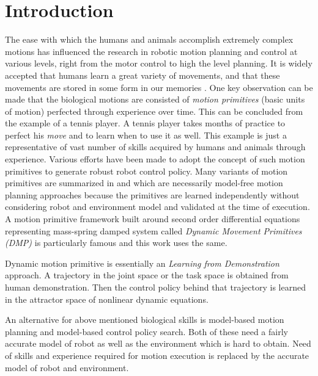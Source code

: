 
\chapter{Introduction}

The ease with which the humans and animals accomplish extremely complex motions has influenced the research in robotic motion planning and control at various levels, right from the motor control to high the level planning. It is widely accepted that humans learn a great variety of movements, and that these movements are stored in some form in our memories \cite{lim2005movement}. One key observation can be made that the biological motions are consisted of \textit{motion primitives} (basic units of motion) perfected through experience over time\cite{schaal2006dynamic}. This can be concluded from the example of a tennis player. A tennis player takes months of practice to perfect his \textit{move} and to learn when to use it as well. This example is just a representative of vast number of skills acquired by humans and animals through experience. Various efforts have been made to adopt the concept of such motion primitives to generate robust robot control policy. Many variants of motion primitives are summarized in \cite{kober2013reinforcement} and \cite{deisenroth2013survey} which are necessarily model-free motion planning approaches because the primitives are learned independently without considering robot and environment model and validated at the time of execution. A motion primitive framework built around second order differential equations representing mass-spring damped system called \textit{Dynamic Movement Primitives (DMP)} is particularly famous and this work uses the same.  

\par Dynamic motion primitive is essentially an \textit{Learning from Demonstration} approach. A trajectory in the joint space or the task space is obtained from human demonstration. Then the control policy behind that trajectory is learned in the attractor space of nonlinear dynamic equations.

\par An alternative for above mentioned biological skills is model-based motion planning and model-based control policy search. Both of these need a fairly accurate model of robot as well as the environment which is hard to obtain. Need of skills and experience required for motion execution is replaced by the accurate model of robot and environment. 

